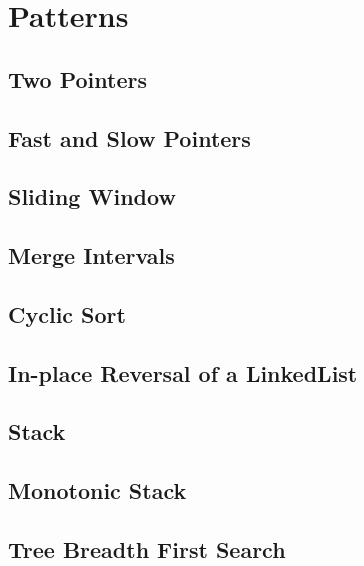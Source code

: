 \chapter{Patterns}

\section{Two Pointers}


\section{Fast and Slow Pointers}


\section{Sliding Window}


\section{Merge Intervals}


\section{Cyclic Sort}


\section{In-place Reversal of a LinkedList}


\section{Stack}


\section{Monotonic Stack}




\section{Tree Breadth First Search}


